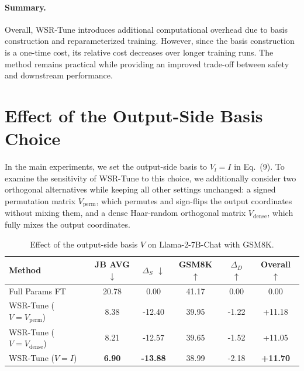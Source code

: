 \documentclass{article}
\newcommand{\kms}[1]{{\leavevmode\color{blue}[MS: #1]}}
\newcommand{\wjb}[1]{{\leavevmode\color{orange}[jb: #1]}}
\begin{document}
\paragraph{Summary.}
Overall, WSR-Tune introduces additional computational overhead due to basis construction and reparameterized training. However, since the basis construction is a one-time cost, its relative cost decreases over longer training runs. The method remains practical while providing an improved trade-off between safety and downstream performance.












\section{Effect of the Output-Side Basis Choice}
\label{app:v_basis}


In the main experiments, we set the output-side basis to $V_l=I$ in Eq.~(9).
To examine the sensitivity of WSR-Tune to this choice, we additionally consider two orthogonal alternatives while keeping all other settings unchanged: a signed permutation matrix $V_{\mathrm{perm}}$, which permutes and sign-flips the output coordinates without mixing them, and a dense Haar-random orthogonal matrix $V_{\mathrm{dense}}$, which fully mixes the output coordinates.

\begin{table}[H]
\centering
\caption{Effect of the output-side basis $V$ on Llama-2-7B-Chat with GSM8K.}
\label{tab:v_basis}
\begin{tabular}{lccccc}
\toprule
Method & JB AVG $\downarrow$ & $\Delta_S$ $\downarrow$ & GSM8K $\uparrow$ & $\Delta_D$ $\uparrow$ & Overall $\uparrow$ \\
\midrule
Full Params FT
& 20.78 & 0.00 & 41.17 & 0.00 & 0.00 \\
WSR-Tune ($V=V_{\mathrm{perm}}$)
& 8.38 & -12.40 & 39.95 & -1.22 & +11.18 \\
WSR-Tune ($V=V_{\mathrm{dense}}$)
& 8.21 & -12.57 & 39.65 & -1.52 & +11.05 \\
WSR-Tune ($V=I$)
& \textbf{6.90} & \textbf{-13.88} & 38.99 & -2.18 & \textbf{+11.70} \\
\bottomrule
\end{tabular}
\end{table}
\end{document}
